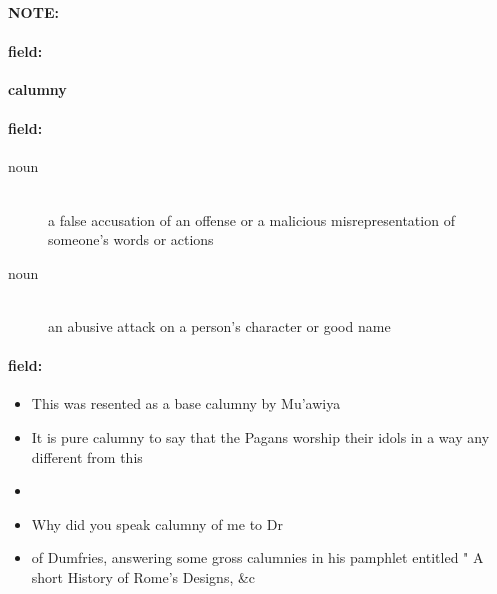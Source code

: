 \documentclass[12pt]{article}
\newenvironment{note}{\paragraph{NOTE:}}{}
\newenvironment{field}{\paragraph{field:}}{}
\begin{document}
\begin{note}
\begin{field}
\textbf{\large calumny}
\end{field}


\begin{field}
\begin{description}
\item[noun] \hfill \\ 
a false accusation of an offense or a malicious misrepresentation of someone's words or actions

\item[noun] \hfill \\ 
an abusive attack on a person's character or good name

\end{description}
\end{field}

\begin{field}
\begin{itemize}
\item This was resented as a base calumny by Mu'awiya
\item It is pure calumny to say that the Pagans worship their idols in a way any different from this
\item 
\item Why did you speak calumny of me to Dr
\item  of Dumfries, answering some gross calumnies in his pamphlet entitled " A short History of Rome's Designs, &c
\end{itemize}
\end{field}
\end{note}
\end{document}
